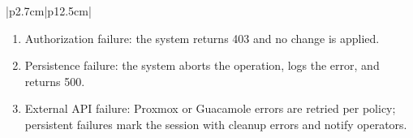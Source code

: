 \begin{table}[H]
\begin{tabular}{|p{2.7cm}|p{12.5cm}|}
\begin{minipage}[t]{\linewidth}
\begin{enumerate}[topsep=0pt,itemsep=1pt,parsep=0pt,partopsep=0pt]
                \item Authorization failure: the system returns 403 and no change is applied.
                \item Persistence failure: the system aborts the operation, logs the error, and returns 500.
                \item External API failure: Proxmox or Guacamole errors are retried per policy; persistent failures mark the session with cleanup errors and notify operators.
            \end{enumerate}
        \end{minipage} \\
        \hline
    \end{tabular}
    \label{tab:eng-terminate-session}
\end{table}

